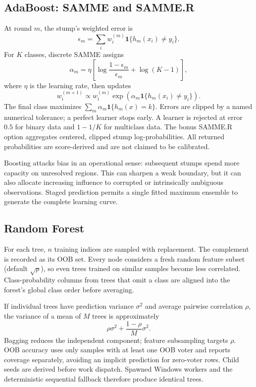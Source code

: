 \documentclass[conference]{IEEEtran}
\begin{document}
\subsection{AdaBoost: SAMME and SAMME.R}
At round $m$, the stump's weighted error is
\begin{equation}
\epsilon_m=\sum_i w_i^{(m)}\mathbf{1}
\{h_m(x_i)\neq y_i\}. \label{eq:adaerror}
\end{equation}
For $K$ classes, discrete SAMME assigns
\begin{equation}
\alpha_m=\eta\left[\log\frac{1-\epsilon_m}{\epsilon_m}
+\log(K-1)\right], \label{eq:alpha}
\end{equation}
where $\eta$ is the learning rate, then updates
\begin{equation}
w_i^{(m+1)}\propto w_i^{(m)}
\exp\left(\alpha_m\mathbf{1}\{h_m(x_i)\neq y_i\}\right). \label{eq:update}
\end{equation}
The final class maximizes $\sum_m\alpha_m\mathbf{1}\{h_m(x)=k\}$.
Errors are clipped by a named numerical tolerance; a perfect learner stops
early. A learner is rejected at error $0.5$ for binary data and $1-1/K$ for
multiclass data. The bonus SAMME.R option aggregates centered, clipped stump
log-probabilities. All returned probabilities are score-derived and are not
claimed to be calibrated.

Boosting attacks bias in an operational sense: subsequent stumps spend more
capacity on unresolved regions. This can sharpen a weak boundary, but it can
also allocate increasing influence to corrupted or intrinsically ambiguous
observations. Staged prediction permits a single fitted maximum ensemble to
generate the complete learning curve.

\subsection{Random Forest}
For each tree, $n$ training indices are sampled with replacement. The
complement is recorded as its OOB set. Every node considers a fresh random
feature subset (default $\sqrt p$), so even trees trained on similar samples
become less correlated. Class-probability columns from trees that omit a class
are aligned into the forest's global class order before averaging.

If individual trees have prediction variance $\sigma^2$ and average pairwise
correlation $\rho$, the variance of a mean of $M$ trees is approximately
\begin{equation}
\rho\sigma^2+\frac{1-\rho}{M}\sigma^2. \label{eq:rfvar}
\end{equation}
Bagging reduces the independent component; feature subsampling targets
$\rho$. OOB accuracy uses only samples with at least one OOB voter and reports
coverage separately, avoiding an implicit prediction for zero-voter rows.
Child seeds are derived before work dispatch. Spawned Windows workers and the
deterministic sequential fallback therefore produce identical trees.
\end{document}
